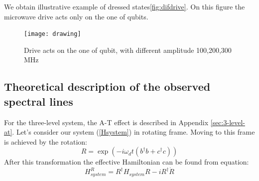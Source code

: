 \documentclass[%
 aip,
 amsmath,amssymb,
 reprint,%
]{revtex4-1}
\begin{document}
We obtain illustrative example of dressed states\autoref{fig:difdrive}. On this figure the microwave drive acts only on the one of qubits. 
\begin{figure}
	\centering
	\texttt{[image: drawing]}
	\caption{Drive acts on the one of qubit, with different amplitude 100,200,300 MHz}
	\label{fig:difdrive}
\end{figure}


\subsection{Theoretical description of the observed spectral lines}
For the three-level system, the A-T effect is described in Appendix \ref{sec:3-level-at}. Let's consider our system (\autoref{Hsystem}) in rotating frame. Moving to this frame is achieved by the rotation:
\begin{equation}
R = \exp(-i\omega_d t (b^{\dagger}b+c^{\dagger}c))
\end{equation}  
After this transformation the effective Hamiltonian can be found from equation:
\begin{equation}
H_{system}^R = R^{\dagger}H_{system}R-iR^{\dagger}\dot{R}
\end{equation}
\end{document}
